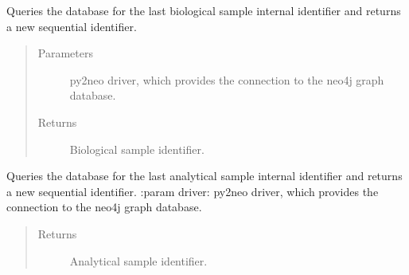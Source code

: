 \documentclass[letterpaper,10pt,english]{sphinxmanual}
\begin{document}
\begin{fulllineitems}
\label{\detokenize{_autosummary/report_manager.apps:report_manager.apps.dataUpload.get_new_biosample_identifier}}
Queries the database for the last biological sample internal identifier and returns a new sequential identifier.
\begin{quote}\begin{description}
\item[{Parameters}] \leavevmode
{} \textendash{} py2neo driver, which provides the connection to the neo4j graph database.

\item[{Returns}] \leavevmode
Biological sample identifier.

\end{description}\end{quote}

\end{fulllineitems}


\begin{fulllineitems}
\label{\detokenize{_autosummary/report_manager.apps:report_manager.apps.dataUpload.get_new_analytical_sample_identifier}}
Queries the database for the last analytical sample internal identifier and returns a new sequential identifier.
:param driver: py2neo driver, which provides the connection to the neo4j graph database.
\begin{quote}\begin{description}
\item[{Returns}] \leavevmode
Analytical sample identifier.

\end{description}\end{quote}

\end{fulllineitems}

\end{document}
